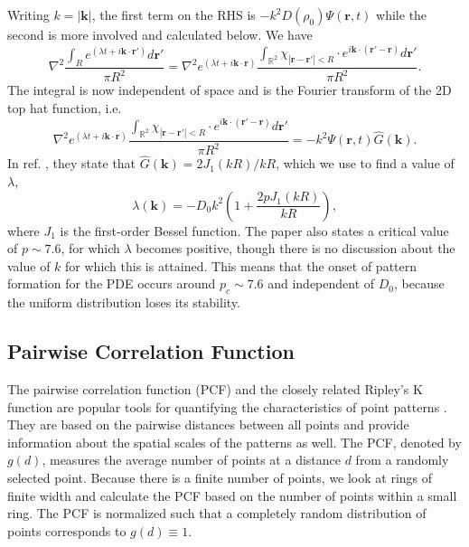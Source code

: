 \documentclass{article}
\renewcommand{\vec}[1]{\boldsymbol{#1}}
\begin{document}
Writing $k=|\vec{k}|$, the first term on the RHS is $-k^2D(\rho_0)\Psi(\vec{r},t)$ while the second is more involved and calculated below.
We have 
\begin{equation} 
 \nabla^2\frac{\int_{R} e^{(\lambda t + i \vec{k} \cdot \vec{r'})}d\vec{r'}}{\pi R^2} = \nabla^2e^{(\lambda t + i \vec{k} \cdot \vec{r})}\frac{\int_{\mathbb{R}^2}\chi_{|\vec{r}-\vec{r'}|<R} \cdot e^{ i \vec{k} \cdot (\vec{r'}-\vec{r})}d\vec{r'}}{\pi R^2}.
\end{equation}
The integral is now independent of space and is the Fourier transform of the 2D top hat function, i.e.
\begin{equation} 
    \nabla^2e^{(\lambda t + i \vec{k} \cdot \vec{r})}\frac{\int_{\mathbb{R}^2}\chi_{|\vec{r}-\vec{r'}|<R} \cdot e^{ i \vec{k} \cdot (\vec{r'}-\vec{r})}d\vec{r'}}{\pi R^2} = -k^2\Psi(\vec{r},t) \hat{G}(\vec{k}).
   \end{equation}
In ref. \cite{lopezMacroscopicDescriptionParticle2006}, they state that $\hat{G}(\vec{k}) = 2J_1(kR) / kR$, which we use to find a value of $\lambda$,
\begin{equation}
    \lambda(\vec{k}) = -D_0 k^2\left(1 + \frac{2pJ_1(kR)}{kR}\right),
\end{equation}
where $J_1$ is the first-order Bessel function.
The paper also states a critical value of $p\sim 7.6$, for which $\lambda $ becomes positive, though there is no discussion about the value of $k$ for which this is attained. 
This means that the onset of pattern formation for the PDE occurs around $p_c \sim 7.6$ and independent of $D_0$, because the uniform distribution loses its stability.


\subsection{Pairwise Correlation Function}
The pairwise correlation function (PCF) and the closely related Ripley's K function are popular tools for quantifying the characteristics of point patterns \autocite{wiegandRingsCirclesNullmodels2004}. 
They are based on the pairwise distances between all points and provide information about the spatial scales of the patterns as well.
The PCF, denoted by $g(d)$, measures the average number of points at a distance $d$ from a randomly selected point.
Because there is a finite number of points, we look at rings of finite width and calculate the PCF based on the number of points within a small ring.
The PCF is normalized such that a completely random distribution of points corresponds to $g(d) \equiv 1$.
\end{document}
